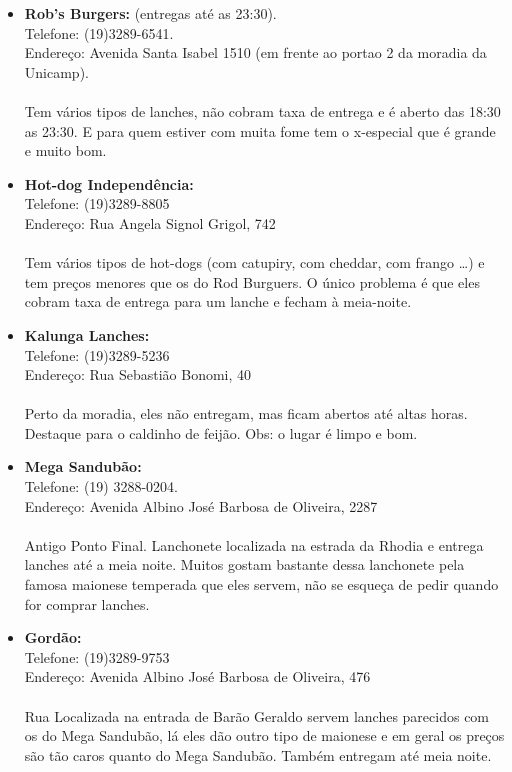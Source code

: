 \begin{itemize}
\item   \textbf{Rob's Burgers:} (entregas até as 23:30).
        \\Telefone: (19)3289-6541.
        \\Endereço: Avenida Santa Isabel 1510 (em frente ao portao 2 da moradia da Unicamp).
        \\\\Tem vários tipos de lanches, não cobram taxa de entrega e é aberto
        das 18:30 as 23:30. E para quem estiver com muita fome tem o x-especial
        que é grande e muito bom.

\item   \textbf{Hot-dog Independência:}
        \\Telefone: (19)3289-8805
        \\Endereço: Rua Angela Signol Grigol, 742
        \\\\Tem vários tipos de hot-dogs (com catupiry, com cheddar, com frango
        {\dots}) e tem preços menores que os do Rod Burguers. O único problema é
        que eles cobram taxa de entrega para um lanche e fecham à meia-noite.

\item   \textbf{Kalunga Lanches:}
        \\Telefone: (19)3289-5236
        \\Endereço: Rua Sebastião Bonomi, 40
        \\\\Perto da moradia, eles não entregam, mas ficam abertos até altas
        horas. Destaque para o caldinho de feijão. Obs: o lugar é limpo e bom.

\item   \textbf{Mega Sandubão:}
        \\Telefone: (19) 3288-0204.
        \\Endereço: Avenida Albino José Barbosa de Oliveira, 2287
        \\\\Antigo Ponto Final. Lanchonete localizada na estrada da Rhodia e entrega lanches até a
        meia noite. Muitos gostam bastante dessa lanchonete pela famosa maionese
        temperada que eles servem, não se esqueça de pedir quando for comprar
        lanches.

\item   \textbf{Gordão:}
        \\Telefone: (19)3289-9753
        \\Endereço: Avenida Albino José Barbosa de Oliveira, 476
        \\\\Rua Localizada na entrada de Barão Geraldo servem lanches parecidos
        com os do Mega Sandubão, lá eles dão outro tipo de maionese e em geral os
        preços são tão caros quanto do Mega Sandubão. Também entregam até meia
        noite.


\end{itemize}
